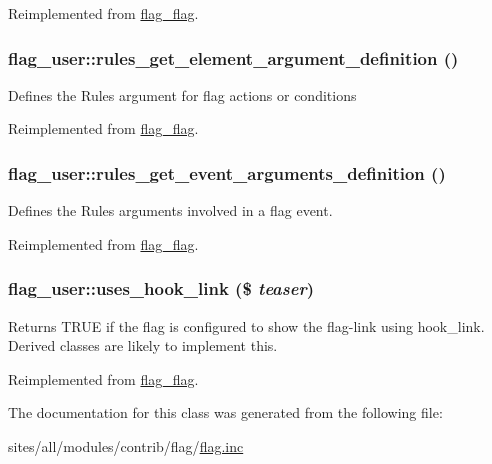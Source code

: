 Reimplemented from \hyperlink{classflag__flag_6fa61cada1cb5f94c64b3037fdd28da1}{flag\_\-flag}.\hypertarget{classflag__user_7ff3a7690719f97b18be24006586f083}{
\subsubsection[{rules\_\-get\_\-element\_\-argument\_\-definition}]{\setlength{\rightskip}{0pt plus 5cm}flag\_\-user::rules\_\-get\_\-element\_\-argument\_\-definition ()}}
\label{classflag__user_7ff3a7690719f97b18be24006586f083}


Defines the Rules argument for flag actions or conditions 

Reimplemented from \hyperlink{group__rules_g88951558f573d816de08b9e9d49ff4c2}{flag\_\-flag}.\hypertarget{classflag__user_1773406a095155a3a1f6f8c0f099b85a}{
\subsubsection[{rules\_\-get\_\-event\_\-arguments\_\-definition}]{\setlength{\rightskip}{0pt plus 5cm}flag\_\-user::rules\_\-get\_\-event\_\-arguments\_\-definition ()}}
\label{classflag__user_1773406a095155a3a1f6f8c0f099b85a}


Defines the Rules arguments involved in a flag event. 

Reimplemented from \hyperlink{group__rules_g21a07dbe1a9e496438d235e95e67c048}{flag\_\-flag}.\hypertarget{classflag__user_279b08bbeb85bdd35710b25e94ebba81}{
\subsubsection[{uses\_\-hook\_\-link}]{\setlength{\rightskip}{0pt plus 5cm}flag\_\-user::uses\_\-hook\_\-link (\$ {\em teaser})}}
\label{classflag__user_279b08bbeb85bdd35710b25e94ebba81}


Returns TRUE if the flag is configured to show the flag-link using hook\_\-link. Derived classes are likely to implement this. 

Reimplemented from \hyperlink{classflag__flag_10e87c5a12cc7b857d388985295bc8ab}{flag\_\-flag}.

The documentation for this class was generated from the following file:\begin{CompactItemize}
\item 
sites/all/modules/contrib/flag/\hyperlink{flag_8inc}{flag.inc}\end{CompactItemize}
